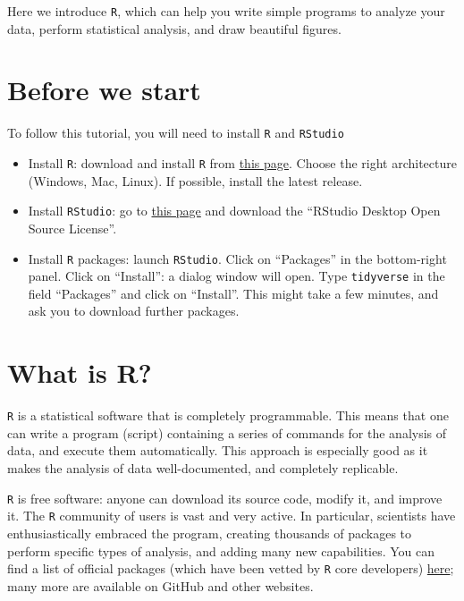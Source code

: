 \documentclass[
  letterpaper,
  DIV=11,
  numbers=noendperiod]{scrreprt}
\providecommand{\tightlist}{%
  \setlength{\itemsep}{0pt}\setlength{\parskip}{0pt}}\usepackage{longtable,booktabs,array}
\begin{document}
Here we introduce \texttt{R}, which can help you write simple programs
to analyze your data, perform statistical analysis, and draw beautiful
figures.

\section*{Before we start}\label{before-we-start}


To follow this tutorial, you will need to install \texttt{R} and
\texttt{RStudio}

\begin{itemize}
\tightlist
\item
  Install \texttt{R}: download and install \texttt{R} from
  \href{https://cran.r-project.org/}{this page}. Choose the right
  architecture (Windows, Mac, Linux). If possible, install the latest
  release.
\item
  Install \texttt{RStudio}: go to
  \href{https://www.rstudio.com/products/rstudio/download/}{this page}
  and download the ``RStudio Desktop Open Source License''.
\item
  Install \texttt{R} packages: launch \texttt{RStudio}. Click on
  ``Packages'' in the bottom-right panel. Click on ``Install'': a dialog
  window will open. Type \texttt{tidyverse} in the field ``Packages''
  and click on ``Install''. This might take a few minutes, and ask you
  to download further packages.
\end{itemize}

\section*{What is R?}\label{what-is-r}


\texttt{R} is a statistical software that is completely programmable.
This means that one can write a program (script) containing a series of
commands for the analysis of data, and execute them automatically. This
approach is especially good as it makes the analysis of data
well-documented, and completely replicable.

\texttt{R} is free software: anyone can download its source code, modify
it, and improve it. The \texttt{R} community of users is vast and very
active. In particular, scientists have enthusiastically embraced the
program, creating thousands of packages to perform specific types of
analysis, and adding many new capabilities. You can find a list of
official packages (which have been vetted by \texttt{R} core developers)
\href{https://cran.r-project.org/web/packages/available_packages_by_name.html}{here};
many more are available on GitHub and other websites.
\end{document}
